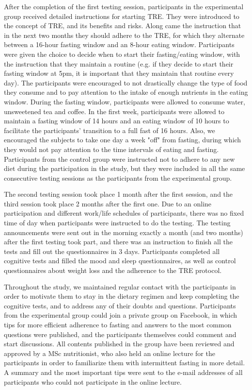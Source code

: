 \documentclass[authordate, empirical]{jote-new-article}
\begin{document}
After the completion of the first testing session, participants in the experimental group received detailed instructions for starting TRE. They were introduced to the concept of TRE, and its benefits and risks. Along came the instruction that in the next two months they should adhere to the TRE, for which they alternate between a 16-hour fasting window and an 8-hour eating window. Participants were given the choice to decide when to start their fasting/eating window, with the instruction that they maintain a routine (e.g. if they decide to start their fasting window at 5pm, it is important that they maintain that routine every day). The participants were encouraged to not drastically change the type of food they consume and to pay attention to the intake of enough nutrients in the eating window. During the fasting window, participants were allowed to consume water, unsweetened tea and coffee. In the first week, participants were allowed to maintain a fasting window of 14 hours and an eating window of 10 hours to facilitate the participants' transition to a full fast of 16 hours. Also, we encouraged the subjects to take one day a week "off" from fasting, during which they would not pay attention to the time intervals of eating and fasting. Participants from the control group were instructed not to adhere to any new diet during the participation in the study, but they were included in all the same consecutive testing sessions as the participants from the experimental group.



The second testing session took place 1 month after the first session, and the third session took place 2 months after the first one. Due to an online participation and different work/life schedules of participants, there was no fixed time of day when participants were instructed to do the testing. The testing announcements were sent out in the morning exactly a month (and two months) after the first testing took part, and there was an instruction to finish all the tests and fill out the questionnaires in 3 days. Participants completed all cognitive tests and filled the mood and sleep questionnaires, as well as control questionnaires about weight loss and the adherence to the TRE protocol.



Throughout the study, we maintained regular contact with the participants in order to motivate them to stay in the dietary regimen and keep completing the cognitive tests, and to address any of their doubts and questions. Participants from the experimental group could join a private group on Facebook, in which tips for more efficient adherence to fasting and answers to the most common questions were published, and the participants themselves could comment and start discussions. All contents published in the group have been reviewed and approved by a MSc nutritionist, who also held an online lecture for the participants in order to familiarize them with intermittent fasting in more detail. A summary and the most important tips were sent to the e-mail addresses of all participants who could not participate in the online lecture.
\end{document}
